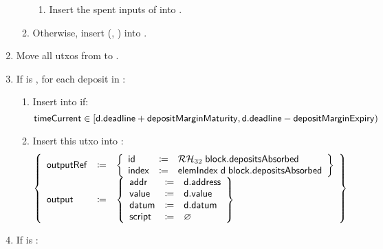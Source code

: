 \documentclass[../hydrozoa.tex]{subfiles}
\begin{document}
\begin{enumerate}
\begin{enumerate}
\begin{enumerate}
            \item Insert the spent inputs of  into .
          \end{enumerate}
        \item Otherwise, insert (, ) into .
      \end{enumerate}
  \item Move all utxos from  to .
  \item If  is , for each deposit  in :
    \begin{enumerate}
      \item Insert  into  if:
        \begin{equation*}
          \mathsf{timeCurrent} \in [\mathsf{d.deadline} + \mathsf{depositMarginMaturity}, \mathsf{d.deadline} - \mathsf{depositMarginExpiry})
        \end{equation*}
      \item Insert this utxo into :
        \begin{equation*}
          \left\{
          \begin{array}{lll}
            \mathsf{outputRef} &\coloneq& \left\{
              \begin{array}{lll}
                \mathsf{id} &\coloneq& \mathcal{RH}_{32} \; \mathsf{block.depositsAbsorbed} \\
                \mathsf{index} &\coloneq& \mathsf{elemIndex} \; \mathsf{d} \; \mathsf{block.depositsAbsorbed}
              \end{array}\right\} \\
            \mathsf{output} &\coloneq& \left\{
              \begin{array}{lll}
                \mathsf{addr} &\coloneq& \mathsf{d.address} \\
                \mathsf{value} &\coloneq& \mathsf{d.value} \\
                \mathsf{datum} &\coloneq& \mathsf{d.datum} \\
                \mathsf{script} &\coloneq& \varnothing
              \end{array}\right\}
          \end{array}\right\}
        \end{equation*}
    \end{enumerate}
  \item If  is :

\end{enumerate}
\end{document}
